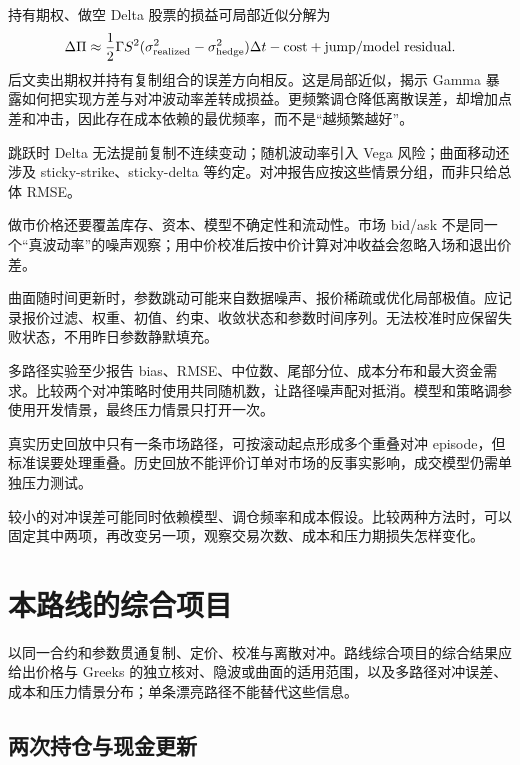 
持有期权、做空 Delta 股票的损益可局部近似分解为
\[
\Delta\Pi\approx
\frac12\Gamma S^2(\sigma_{\rm realized}^2-\sigma_{\rm hedge}^2)\Delta t
-\text{cost}+\text{jump/model residual}.
\]
后文卖出期权并持有复制组合的误差方向相反。这是局部近似，揭示 Gamma 暴露如何把实现方差与对冲波动率差转成损益。更频繁调仓降低离散误差，却增加点差和冲击，因此存在成本依赖的最优频率，而不是“越频繁越好”。

跳跃时 Delta 无法提前复制不连续变动；随机波动率引入 Vega 风险；曲面移动还涉及 sticky-strike、sticky-delta 等约定。对冲报告应按这些情景分组，而非只给总体 RMSE。


做市价格还要覆盖库存、资本、模型不确定性和流动性。市场 bid/ask 不是同一个“真波动率”的噪声观察；用中价校准后按中价计算对冲收益会忽略入场和退出价差。

曲面随时间更新时，参数跳动可能来自数据噪声、报价稀疏或优化局部极值。应记录报价过滤、权重、初值、约束、收敛状态和参数时间序列。无法校准时应保留失败状态，不用昨日参数静默填充。


多路径实验至少报告 bias、RMSE、中位数、尾部分位、成本分布和最大资金需求。比较两个对冲策略时使用共同随机数，让路径噪声配对抵消。模型和策略调参使用开发情景，最终压力情景只打开一次。

真实历史回放中只有一条市场路径，可按滚动起点形成多个重叠对冲 episode，但标准误要处理重叠。历史回放不能评价订单对市场的反事实影响，成交模型仍需单独压力测试。

\begin{diagnostic}
较小的对冲误差可能同时依赖模型、调仓频率和成本假设。比较两种方法时，可以固定其中两项，再改变另一项，观察交易次数、成本和压力期损失怎样变化。
\end{diagnostic}

\section{本路线的综合项目}

以同一合约和参数贯通复制、定价、校准与离散对冲。路线综合项目的综合结果应给出价格与 Greeks 的独立核对、隐波或曲面的适用范围，以及多路径对冲误差、成本和压力情景分布；单条漂亮路径不能替代这些信息。

\subsection{两次持仓与现金更新}


